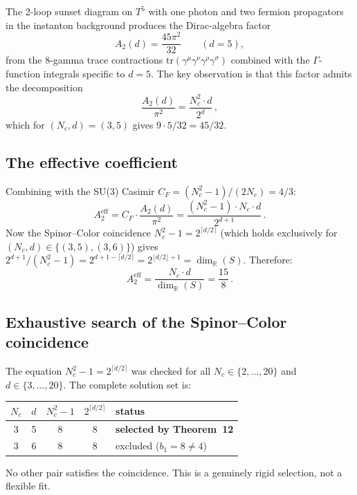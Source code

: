 \documentclass[11pt,a4paper]{article}
\begin{document}
The 2-loop sunset diagram on $T^5$ with one photon and two fermion
propagators in the instanton background produces the Dirac-algebra
factor
\[
  A_2(d) = \frac{45\pi^2}{32} \qquad (d=5),
\]
from the 8-gamma trace contractions $\mathrm{tr}(\gamma^\mu\gamma^\nu
\gamma^\rho\gamma^\sigma)$ combined with the $\Gamma$-function integrals
specific to $d=5$.  The key observation is that this factor admits the
decomposition
\begin{equation}\label{eq:A2factor}
  \frac{A_2(d)}{\pi^2} = \frac{N_c^2\cdot d}{2^d}\,,
\end{equation}
which for $(N_c,d)=(3,5)$ gives $9\cdot 5/32=45/32$.

\subsection{The effective coefficient}

Combining with the SU(3) Casimir $C_F=(N_c^2-1)/(2N_c)=4/3$:
\[
  A_2^{\mathrm{eff}} = C_F\cdot\frac{A_2(d)}{\pi^2}
  = \frac{(N_c^2-1)\cdot N_c\cdot d}{2^{d+1}}\,.
\]
Now the Spinor--Color coincidence $N_c^2-1=2^{\lceil d/2\rceil}$
(which holds exclusively for $(N_c,d)\in\{(3,5),(3,6)\}$) gives
$2^{d+1}/(N_c^2-1) = 2^{d+1-\lceil d/2\rceil} = 2^{\lfloor d/2\rfloor+1}
= \dim_\mathbb{R}(S)$.  Therefore:
\[
  A_2^{\mathrm{eff}} = \frac{N_c\cdot d}{\dim_\mathbb{R}(S)}
  = \frac{15}{8}\,.
\]

\subsection{Exhaustive search of the Spinor--Color coincidence}

The equation $N_c^2-1=2^{\lceil d/2\rceil}$ was checked for all
$N_c\in\{2,\ldots,20\}$ and $d\in\{3,\ldots,20\}$.  The complete
solution set is:
\begin{center}
\renewcommand{\arraystretch}{1.1}
\begin{tabular}{ccccl}
\toprule
$N_c$ & $d$ & $N_c^2-1$ & $2^{\lceil d/2\rceil}$ & status\\
\midrule
3 & 5 & 8 & 8 & \textbf{selected by Theorem~12}\\
3 & 6 & 8 & 8 & excluded ($b_1=8\neq 4$)\\
\bottomrule
\end{tabular}
\end{center}

No other pair satisfies the coincidence.  This is a genuinely rigid
selection, not a flexible fit.
\end{document}
